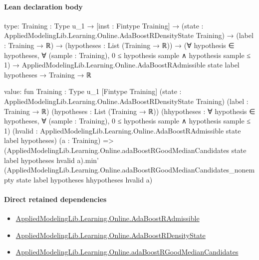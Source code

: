 \documentclass[10pt]{article}
\begin{document}
\paragraph{Lean declaration body}
\begin{ReviewVerbatim}
type:
{Training : Type u_1} →
  [inst : Fintype Training] →
    (state : AppliedModelingLib.Learning.Online.AdaBoostRDensityState Training) →
      (label : Training → ℝ) →
        (hypotheses : List (Training → ℝ)) →
          (∀ hypothesis ∈ hypotheses, ∀ (sample : Training), 0 ≤ hypothesis sample ∧ hypothesis sample ≤ 1) →
            AppliedModelingLib.Learning.Online.AdaBoostRAdmissible state label hypotheses → Training → ℝ

value:
fun {Training : Type u_1} [Fintype Training] (state : AppliedModelingLib.Learning.Online.AdaBoostRDensityState Training)
    (label : Training → ℝ) (hypotheses : List (Training → ℝ))
    (hhypotheses : ∀ hypothesis ∈ hypotheses, ∀ (sample : Training), 0 ≤ hypothesis sample ∧ hypothesis sample ≤ 1)
    (hvalid : AppliedModelingLib.Learning.Online.AdaBoostRAdmissible state label hypotheses) (a : Training) =>
  (AppliedModelingLib.Learning.Online.adaBoostRGoodMedianCandidates state label hypotheses hvalid a).min'
    (AppliedModelingLib.Learning.Online.adaBoostRGoodMedianCandidates_nonempty state label hypotheses hhypotheses hvalid
      a)
\end{ReviewVerbatim}

\paragraph{Direct retained dependencies}
\begin{itemize}\raggedright
\item \hyperlink{library-prerequisite-629f39db1994b79f}{Applied\allowbreak{}Modeling\allowbreak{}Lib.\allowbreak{}Learning.\allowbreak{}Online.\allowbreak{}Ada\allowbreak{}Boost\allowbreak{}R\allowbreak{}Admissible}
\item \hyperlink{library-prerequisite-05718297c0c800e4}{Applied\allowbreak{}Modeling\allowbreak{}Lib.\allowbreak{}Learning.\allowbreak{}Online.\allowbreak{}Ada\allowbreak{}Boost\allowbreak{}R\allowbreak{}Density\allowbreak{}State}
\item \hyperlink{governing-declaration-bf23f794feb6379a}{Applied\allowbreak{}Modeling\allowbreak{}Lib.\allowbreak{}Learning.\allowbreak{}Online.\allowbreak{}ada\allowbreak{}Boost\allowbreak{}R\allowbreak{}Good\allowbreak{}Median\allowbreak{}Candidates}
\end{itemize}
\hypertarget{governing-declaration-1a98c50ff47580d5}{}
\end{document}
